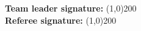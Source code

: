 \begin{flushleft}
\textbf{Team leader signature:} \line(1,0){200}\\
\vspace{0.4cm}
\textbf{Referee signature:} \line(1,0){200}
\end{flushleft}
